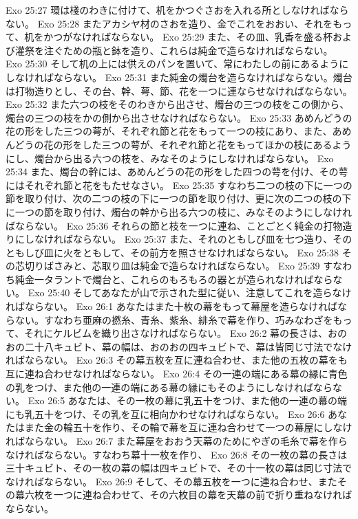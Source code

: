 Exo 25:27  環は棧のわきに付けて、机をかつぐさおを入れる所としなければならない。
Exo 25:28  またアカシヤ材のさおを造り、金でこれをおおい、それをもって、机をかつがなければならない。
Exo 25:29  また、その皿、乳香を盛る杯および灌祭を注ぐための瓶と鉢を造り、これらは純金で造らなければならない。
Exo 25:30  そして机の上には供えのパンを置いて、常にわたしの前にあるようにしなければならない。
Exo 25:31  また純金の燭台を造らなければならない。燭台は打物造りとし、その台、幹、萼、節、花を一つに連ならせなければならない。
Exo 25:32  また六つの枝をそのわきから出させ、燭台の三つの枝をこの側から、燭台の三つの枝をかの側から出させなければならない。
Exo 25:33  あめんどうの花の形をした三つの萼が、それぞれ節と花をもって一つの枝にあり、また、あめんどうの花の形をした三つの萼が、それぞれ節と花をもってほかの枝にあるようにし、燭台から出る六つの枝を、みなそのようにしなければならない。
Exo 25:34  また、燭台の幹には、あめんどうの花の形をした四つの萼を付け、その萼にはそれぞれ節と花をもたせなさい。
Exo 25:35  すなわち二つの枝の下に一つの節を取り付け、次の二つの枝の下に一つの節を取り付け、更に次の二つの枝の下に一つの節を取り付け、燭台の幹から出る六つの枝に、みなそのようにしなければならない。
Exo 25:36  それらの節と枝を一つに連ね、ことごとく純金の打物造りにしなければならない。
Exo 25:37  また、それのともしび皿を七つ造り、そのともしび皿に火をともして、その前方を照させなければならない。
Exo 25:38  その芯切りばさみと、芯取り皿は純金で造らなければならない。
Exo 25:39  すなわち純金一タラントで燭台と、これらのもろもろの器とが造られなければならない。
Exo 25:40  そしてあなたが山で示された型に従い、注意してこれを造らなければならない。
Exo 26:1  あなたはまた十枚の幕をもって幕屋を造らなければならない。すなわち亜麻の撚糸、青糸、紫糸、緋糸で幕を作り、巧みなわざをもって、それにケルビムを織り出さなければならない。
Exo 26:2  幕の長さは、おのおの二十八キュビト、幕の幅は、おのおの四キュビトで、幕は皆同じ寸法でなければならない。
Exo 26:3  その幕五枚を互に連ね合わせ、また他の五枚の幕をも互に連ね合わせなければならない。
Exo 26:4  その一連の端にある幕の縁に青色の乳をつけ、また他の一連の端にある幕の縁にもそのようにしなければならない。
Exo 26:5  あなたは、その一枚の幕に乳五十をつけ、また他の一連の幕の端にも乳五十をつけ、その乳を互に相向かわせなければならない。
Exo 26:6  あなたはまた金の輪五十を作り、その輪で幕を互に連ね合わせて一つの幕屋にしなければならない。
Exo 26:7  また幕屋をおおう天幕のためにやぎの毛糸で幕を作らなければならない。すなわち幕十一枚を作り、
Exo 26:8  その一枚の幕の長さは三十キュビト、その一枚の幕の幅は四キュビトで、その十一枚の幕は同じ寸法でなければならない。
Exo 26:9  そして、その幕五枚を一つに連ね合わせ、またその幕六枚を一つに連ね合わせて、その六枚目の幕を天幕の前で折り重ねなければならない。
